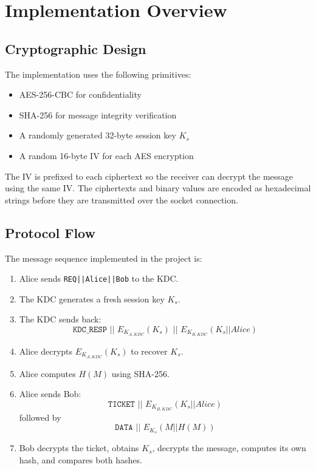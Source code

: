 \documentclass[12pt,a4paper]{article}
\begin{document}
\section{Implementation Overview}
\subsection{Cryptographic Design}
The implementation uses the following primitives:

\begin{itemize}
    \item AES-256-CBC for confidentiality
    \item SHA-256 for message integrity verification
    \item A randomly generated 32-byte session key \(K_s\)
    \item A random 16-byte IV for each AES encryption
\end{itemize}

The IV is prefixed to each ciphertext so the receiver can decrypt the message using
the same IV. The ciphertexts and binary values are encoded as hexadecimal strings
before they are transmitted over the socket connection.

\subsection{Protocol Flow}
The message sequence implemented in the project is:

\begin{enumerate}
    \item Alice sends \texttt{REQ||Alice||Bob} to the KDC.
    \item The KDC generates a fresh session key \(K_s\).
    \item The KDC sends back:
    \[
    \texttt{KDC\_RESP || } E_{K_{A,KDC}}(K_s) \texttt{ || } E_{K_{B,KDC}}(K_s || Alice)
    \]
    \item Alice decrypts \(E_{K_{A,KDC}}(K_s)\) to recover \(K_s\).
    \item Alice computes \(H(M)\) using SHA-256.
    \item Alice sends Bob:
    \[
    \texttt{TICKET || } E_{K_{B,KDC}}(K_s || Alice)
    \]
    followed by
    \[
    \texttt{DATA || } E_{K_s}(M || H(M))
    \]
    \item Bob decrypts the ticket, obtains \(K_s\), decrypts the message, computes
    its own hash, and compares both hashes.
\end{enumerate}
\end{document}
